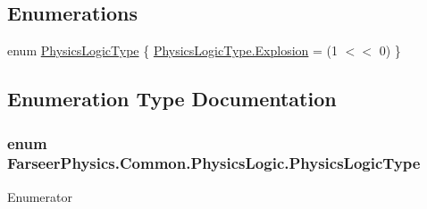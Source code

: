 \subsection*{Enumerations}
\begin{DoxyCompactItemize}
\item 
enum \hyperlink{namespace_farseer_physics_1_1_common_1_1_physics_logic_a2d07851d80889d4aae171f9d9fc81feb}{Physics\+Logic\+Type} \{ \hyperlink{namespace_farseer_physics_1_1_common_1_1_physics_logic_a2d07851d80889d4aae171f9d9fc81feba8a36c0d6cc2e31990ea4fb2d597db968}{Physics\+Logic\+Type.\+Explosion} = (1 $<$$<$ 0)
 \}
\end{DoxyCompactItemize}


\subsection{Enumeration Type Documentation}
\hypertarget{namespace_farseer_physics_1_1_common_1_1_physics_logic_a2d07851d80889d4aae171f9d9fc81feb}{
\subsubsection[{Physics\+Logic\+Type}]{\setlength{\rightskip}{0pt plus 5cm}enum {\bf Farseer\+Physics.\+Common.\+Physics\+Logic.\+Physics\+Logic\+Type}}}\label{namespace_farseer_physics_1_1_common_1_1_physics_logic_a2d07851d80889d4aae171f9d9fc81feb}
\begin{Desc}
\item[Enumerator]\par
\begin{description}
\item[{\em 
\hypertarget{namespace_farseer_physics_1_1_common_1_1_physics_logic_a2d07851d80889d4aae171f9d9fc81feba8a36c0d6cc2e31990ea4fb2d597db968}{Explosion}\label{namespace_farseer_physics_1_1_common_1_1_physics_logic_a2d07851d80889d4aae171f9d9fc81feba8a36c0d6cc2e31990ea4fb2d597db968}
}]\end{description}
\end{Desc}
